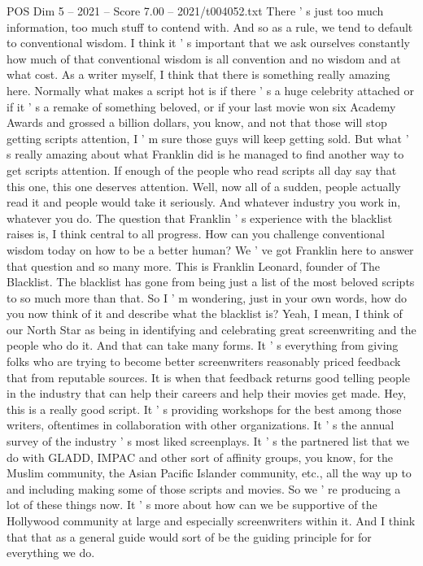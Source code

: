 \begin{textsample}{POS Dim 5 – 2021 – Score 7.00 – 2021/t004052.txt}
There ' s just too much information, too much stuff to contend with.
And so as a rule, we tend to default to conventional wisdom.
I think it ' s important that we ask ourselves constantly how much of that conventional wisdom is all convention and no wisdom and at what cost.
As a writer myself, I think that there is something really amazing here.
Normally what makes a script hot is if there ' s a huge celebrity attached or if it ' s a remake of something beloved, or if your last movie won six Academy Awards and grossed a billion dollars, you know, and not that those will stop getting scripts attention, I ' m sure those guys will keep getting sold.
But what ' s really amazing about what Franklin did is he managed to find another way to get scripts attention.
If enough of the people who read scripts all day say that this one, this one deserves attention.
Well, now all of a sudden, people actually read it and people would take it seriously.
And whatever industry you work in, whatever you do.
The question that Franklin ' s experience with the blacklist raises is, I think central to all progress.
How can you challenge conventional wisdom today on how to be a better human?
We ' ve got Franklin here to answer that question and so many more.
This is Franklin Leonard, founder of The Blacklist.
The blacklist has gone from being just a list of the most beloved scripts to so much more than that.
So I ' m wondering, just in your own words, how do you now think of it and describe what the blacklist is?
Yeah, I mean, I think of our North Star as being in identifying and celebrating great screenwriting and the people who do it.
And that can take many forms.
It ' s everything from giving folks who are trying to become better screenwriters reasonably priced feedback that from reputable sources.
It is when that feedback returns good telling people in the industry that can help their careers and help their movies get made.
Hey, this is a really good script.
It ' s providing workshops for the best among those writers, oftentimes in collaboration with other organizations.
It ' s the annual survey of the industry ' s most liked screenplays.
It ' s the partnered list that we do with GLADD, IMPAC and other sort of affinity groups, you know, for the Muslim community, the Asian Pacific Islander community, etc., all the way up to and including making some of those scripts and movies.
So we ' re producing a lot of these things now.
It ' s more about how can we be supportive of the Hollywood community at large and especially screenwriters within it.
And I think that that as a general guide would sort of be the guiding principle for for everything we do.

\end{textsample}
